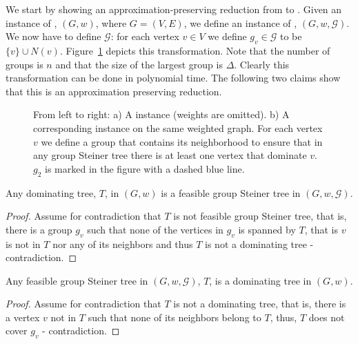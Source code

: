 We start by showing an approximation-preserving reduction from \Prob{} to
\ProbGroup{}.
Given an instance of \Prob{}, $(G, w)$, where $G = (V, E)$, 
we define an instance of \ProbGroup{},
$(G, w, \mathcal{G})$.
We now have to define $\mathcal{G}$: for each vertex $v \in V$ we define 
$g_v \in \mathcal{G}$ to be $\{v\} \cup N(v)$.
Figure~\ref{fig:prob-leq-group} depicts this transformation.
Note that the number of groups is $n$ and that the size of the largest group is $\Delta$.
Clearly this transformation can be done in polynomial time.
The following two claims show that this is an approximation preserving reduction. 

\begin{figure}
\begin{center}
\scalebox{.8}{

}
\end{center}
\caption{\label{fig:prob-leq-group}
From left to right:
a) A \Prob{} instance (weights are omitted).
b) A corresponding \ProbGroup{} instance on the same weighted graph.
For each vertex $v$ we define a group
that contains its neighborhood to ensure that in any group Steiner tree there is at least
one vertex that dominate $v$.
$g_2$ is marked in the figure with a dashed blue line.  
}
\end{figure}

\begin{claim}
Any dominating tree, $T$, in $(G, w)$ 
is a feasible group Steiner tree in $(G, w, \mathcal{G})$.
\end{claim}

\begin{proof}
Assume for contradiction that $T$ is not feasible group Steiner tree, that is, there is 
a group $g_v$ such that none of the vertices in $g_v$ is spanned by $T$, that is $v$
is not in $T$ nor any of its neighbors and thus $T$ is not a dominating tree - contradiction. 
\end{proof}
 
\begin{claim}
Any feasible group Steiner tree in $(G, w, \mathcal{G})$, $T$, is a dominating tree
in $(G, w)$.
\end{claim}

\begin{proof}
Assume for contradiction that $T$ is not a dominating tree, that is, there is 
a vertex $v$ not in $T$ such that none of its neighbors belong to $T$, thus, 
$T$ does not cover $g_v$ - contradiction. 
\end{proof}
